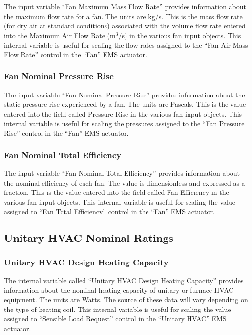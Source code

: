 The input variable ``Fan Maximum Mass Flow Rate'' provides information about the maximum flow rate for a fan. The units are kg/s. This is the mass flow rate (for dry air at standard conditions) associated with the volume flow rate entered into the Maximum Air Flow Rate (m\(^{3}\)/s) in the various fan input objects. This internal variable is useful for scaling the flow rates assigned to the ``Fan Air Mass Flow Rate'' control in the ``Fan'' EMS actuator.

\subsubsection{Fan Nominal Pressure Rise}\label{fan-nominal-pressure-rise}

The input variable ``Fan Nominal Pressure Rise'' provides information about the static pressure rise experienced by a fan. The units are Pascals. This is the value entered into the field called Pressure Rise in the various fan input objects. This internal variable is useful for scaling the pressures assigned to the ``Fan Pressure Rise'' control in the ``Fan'' EMS actuator.

\subsubsection{Fan Nominal Total Efficiency}\label{fan-nominal-total-efficiency}

The input variable ``Fan Nominal Total Efficiency'' provides information about the nominal efficiency of each fan. The value is dimensionless and expressed as a fraction. This is the value entered into the field called Fan Efficiency in the various fan input objects. This internal variable is useful for scaling the value assigned to ``Fan Total Efficiency'' control in the ``Fan'' EMS actuator.

\subsection{Unitary HVAC Nominal Ratings}\label{unitary-hvac-nominal-ratings}

\subsubsection{Unitary HVAC Design Heating Capacity}\label{unitary-hvac-design-heating-capacity}

The internal variable called ``Unitary HVAC Design Heating Capacity'' provides information about the nominal heating capacity of unitary or furnace HVAC equipment. The units are Watts. The source of these data will vary depending on the type of heating coil. This internal variable is useful for scaling the value assigned to ``Sensible Load Request'' control in the ``Unitary HVAC'' EMS actuator.

